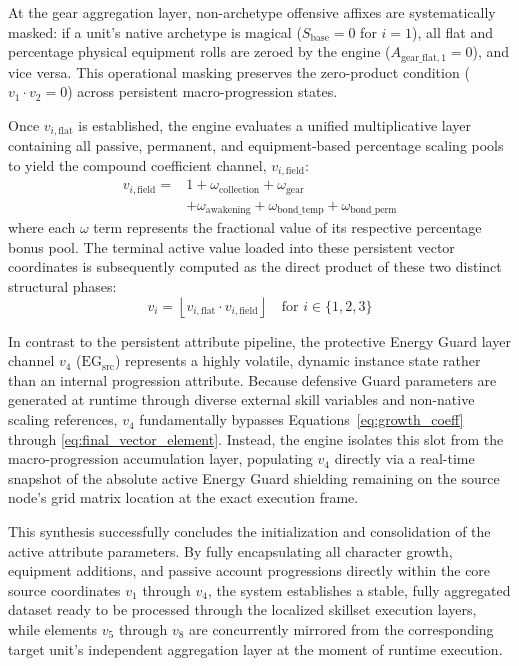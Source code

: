 \documentclass[twocolumn,10pt]{article}
\begin{document}
At the gear aggregation layer, non-archetype offensive affixes are systematically masked: if a unit's native archetype is magical ($S_{\text{base}} = 0$ for $i=1$), all flat and percentage physical equipment rolls are zeroed by the engine ($A_{\text{gear\_flat}, 1} = 0$), and vice versa. This operational masking preserves the zero-product condition ($v_1 \cdot v_2 = 0$) across persistent macro-progression states.

Once $v_{i,\text{flat}}$ is established, the engine evaluates a unified multiplicative layer containing all passive, permanent, and equipment-based percentage scaling pools to yield the compound coefficient channel, $v_{i,\text{field}}$:
\begin{equation}
\begin{split}
v_{i,\text{field}} = {} & 1 + \omega_{\text{collection}} + \omega_{\text{gear}} \\
& + \omega_{\text{awakening}} + \omega_{\text{bond\_temp}} + \omega_{\text{bond\_perm}}
\end{split}
\label{eq:field_stat_construction}
\end{equation}
where each $\omega$ term represents the fractional value of its respective percentage bonus pool. The terminal active value loaded into these persistent vector coordinates is subsequently computed as the direct product of these two distinct structural phases:
\begin{equation}
v_i = \left\lfloor v_{i,\text{flat}} \cdot v_{i,\text{field}} \right\rfloor \quad \text{for } i \in \{1, 2, 3\} 
\label{eq:final_vector_element}
\end{equation}

In contrast to the persistent attribute pipeline, the protective Energy Guard layer channel $v_4$ ($\text{EG}_{\text{src}}$) represents a highly volatile, dynamic instance state rather than an internal progression attribute. Because defensive Guard parameters are generated at runtime through diverse external skill variables and non-native scaling references, $v_4$ fundamentally bypasses Equations~\ref{eq:growth_coeff} through \ref{eq:final_vector_element}. Instead, the engine isolates this slot from the macro-progression accumulation layer, populating $v_4$ directly via a real-time snapshot of the absolute active Energy Guard shielding remaining on the source node's grid matrix location at the exact execution frame.

This synthesis successfully concludes the initialization and consolidation of the active attribute parameters. By fully encapsulating all character growth, equipment additions, and passive account progressions directly within the core source coordinates $v_1$ through $v_4$, the system establishes a stable, fully aggregated dataset ready to be processed through the localized skillset execution layers, while elements $v_5$ through $v_8$ are concurrently mirrored from the corresponding target unit's independent aggregation layer at the moment of runtime execution.
\end{document}
